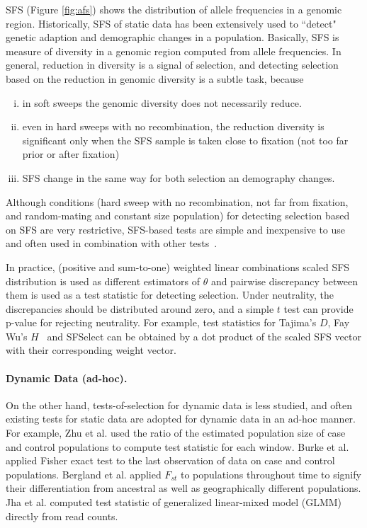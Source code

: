 \documentclass[11pt]{article}
\begin{document}
SFS (Figure \ref{fig:afs}) shows the distribution of allele 
frequencies in a genomic region.
Historically, SFS of static data has been extensively used to 
``detect" genetic 
adaption and demographic changes in a population. Basically, 
SFS is measure of diversity in a genomic region computed from allele 
frequencies. 
In general, reduction in diversity is a signal of 
selection, and detecting selection based on the reduction in 
genomic diversity is a subtle task, because 
\begin{enumerate}[(i)]
	\item  in soft sweeps the genomic diversity does not 
	necessarily reduce.
	\item even in hard sweeps with no recombination, the 
	reduction diversity is 
	significant only when the SFS sample is taken close to 
	fixation (not too 
	far prior or after fixation)
	\item SFS change in the same way for both selection an 
	demography changes. 
\end{enumerate}

Although conditions (hard sweep with no recombination, not 
far from 
fixation, and random-mating and constant size population) 
for detecting 
selection based on SFS are very restrictive, SFS-based tests 
are simple and 
inexpensive to use and often used in combination with 
other tests~\cite{akey2009constructing,vitti2013detecting}. 

In practice, (positive and sum-to-one) weighted 
linear combinations scaled SFS distribution \cite{achaz2009frequency}
is used as different estimators of $\theta$ and pairwise discrepancy between 
them is used as a test statistic for detecting selection.
Under neutrality, the discrepancies should be distributed around zero, and a 
simple $t$ test can provide p-value for rejecting neutrality. 
For example, 
test statistics for Tajima's $D$\cite{tajima1989statistical}, 
Fay Wu's $H$~\cite{fay2000hitchhiking} and 
SFSelect\cite{ronen2013learning} can be obtained by a dot 
product of the scaled SFS vector with their corresponding weight vector. 




\paragraph{Dynamic Data (ad-hoc).} On the other hand, tests-of-selection for 
dynamic 
data is less studied, and 
often existing tests for static data are adopted for dynamic data in an ad-hoc 
manner. For example, Zhu et al. \cite{zhou2011experimental} used the ratio of 
the estimated 
population size of case and control populations to compute test statistic for 
each window.
Burke et al.~\cite{burke2010genome} applied 
 Fisher exact test to the last observation of data on case and control 
 populations.
 Bergland et al. \cite{bergland2014genomic} 
 applied $F_{st}$ to populations throughout time to signify their 
 differentiation from ancestral as well as geographically different 
 populations. 
 Jha et al. \cite{jha2015whole} 
 computed test statistic of generalized 
 linear-mixed model (GLMM) directly from read counts. 
\end{document}
